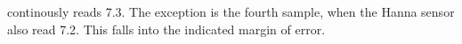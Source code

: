 continously reads 7.3. The exception is the fourth sample, when the Hanna sensor also read 7.2. This falls into the indicated margin of error.